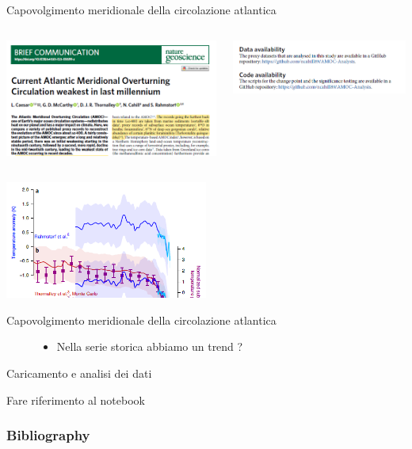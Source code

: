 \documentclass{beamer}
\begin{document}
\begin{frame}{Capovolgimento meridionale della circolazione atlantica}
\begin{columns}
\begin{column}{0.5\textwidth}
\includegraphics[width=\textwidth ]{Pic/AMOC_nature_1.png}
\end{column}
\begin{column}{0.5\textwidth}
\includegraphics[width=\textwidth ]{Pic/AMOC_nature_2.png}
\end{column}
\end{columns}
\begin{center}
\includegraphics[width=0.5\textwidth ]{Pic/AMOC_nature_3.png}
\end{center}
\end{frame}

\begin{frame}{Capovolgimento meridionale della circolazione atlantica}
\begin{figure}
\begin{itemize}
\item Nella serie storica abbiamo un trend ? 
\end{itemize}
\end{figure}
\end{frame}

\begin{frame}{Caricamento e analisi dei dati}
\begin{center}
Fare riferimento al notebook
\end{center}
\end{frame}



\begin{frame}[t,allowframebreaks]
\frametitle{Bibliography}
\printbibliography
\end{frame}
\end{document}
